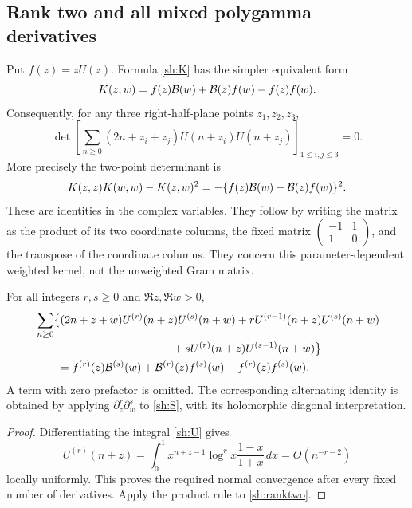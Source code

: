 \subsection{Rank two and all mixed polygamma derivatives}

Put $f(z)=zU(z)$. Formula \eqref{sh:K} has the simpler equivalent form
\begin{equation}\label{sh:ranktwo}
 K(z,w)=f(z)\mathcal B(w)+\mathcal B(z)f(w)-f(z)f(w).
\end{equation}
Consequently, for any three right-half-plane points $z_1,z_2,z_3$,
\begin{equation}\label{sh:det3}
 \det\left[
 \sum_{n\ge0}(2n+z_i+z_j)U(n+z_i)U(n+z_j)
                  \right]_{1\le i,j\le3}=0.
\end{equation}
More precisely the two-point determinant is
\begin{equation}\label{sh:det2}
 K(z,z)K(w,w)-K(z,w)^2
       =-\{f(z)\mathcal B(w)-\mathcal B(z)f(w)\}^2.
\end{equation}
These are identities in the complex variables. They follow by writing
the matrix as the product of its two coordinate columns, the fixed
matrix $\left(\begin{smallmatrix}-1&1\\1&0\end{smallmatrix}\right)$,
and the transpose of the coordinate columns. They concern this
parameter-dependent weighted kernel, not the unweighted Gram matrix.

\begin{corollary}
\label{sh:mixed}
For all integers $r,s\ge0$ and $\Re z,\Re w>0$,
\begin{align}\label{sh:mixed-formula}
 &\sum_{n\ge0}\bigl\{
 (2n+z+w)U^{(r)}(n+z)U^{(s)}(n+w)
 +rU^{(r-1)}(n+z)U^{(s)}(n+w)\notag\\[-2pt]
 &\hspace{43mm}
 +sU^{(r)}(n+z)U^{(s-1)}(n+w)\bigr\}\notag\\
 &\qquad=f^{(r)}(z)\Bcal^{(s)}(w)
       +\Bcal^{(r)}(z)f^{(s)}(w)-f^{(r)}(z)f^{(s)}(w).
\end{align}
A term with zero prefactor is omitted. The corresponding alternating
identity is obtained by applying $\partial_z^r\partial_w^s$ to
\eqref{sh:S}, with its holomorphic diagonal interpretation.
\end{corollary}

\begin{proof}
Differentiating the integral \eqref{sh:U} gives
\[
 U^{(r)}(n+z)=\int_0^1x^{n+z-1}\log^r x\frac{1-x}{1+x}\,dx
                  =O(n^{-r-2})
\]
locally uniformly. This proves the required normal convergence
after every fixed number of derivatives. Apply the product rule to
\eqref{sh:ranktwo}.
\end{proof}

